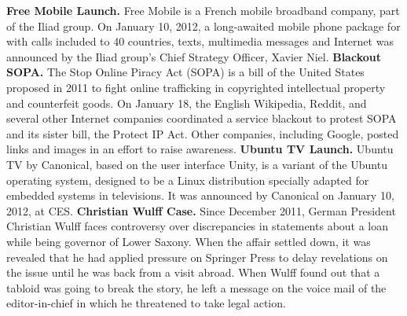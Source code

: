 \documentclass{acm_proc_article-sp}
\newcommand{\inlinelistingsize}{\fontsize{8pt}{11pt}}
\let\oldurl\url
\renewcommand{\url}[1]{\inlinelistingsize\oldurl{#1}}
\begin{document}
\textbf{Free Mobile Launch.} Free Mobile is a French mobile broadband company, part of the Iliad group. On January 10, 2012, a long-awaited mobile phone package for  with calls included to 40 countries, texts, multimedia messages and Internet was announced by the Iliad group's Chief Strategy Officer, Xavier Niel.
\newline
\textbf{Blackout SOPA.} The Stop Online Piracy Act (SOPA) is a bill of the United States proposed in 2011 to fight online trafficking in copyrighted intellectual property and counterfeit goods. On January 18, the English Wikipedia, Reddit, and several other Internet companies coordinated a service blackout to protest SOPA and its sister bill, the Protect IP Act. Other companies, including Google, posted links and images in an effort to raise awareness.
\newline
\textbf{Ubuntu TV Launch.} Ubuntu TV by Canonical, based on the user interface Unity, is a variant of the Ubuntu operating system, designed to be a Linux distribution specially adapted for embedded systems in televisions. It was announced by Canonical on January 10, 2012, at CES.
\newline
\textbf{Christian Wulff Case.} Since December 2011, German President Christian Wulff faces controversy over discrepancies in statements about a loan while being governor of Lower Saxony. When the affair settled down, it was revealed that he had applied pressure on Springer Press to delay revelations on the issue until he was back from a visit abroad. When Wulff found out that a tabloid was going to break the story, he left a message on the voice mail of the editor-in-chief in which he threatened to take legal action.

\end{document}
